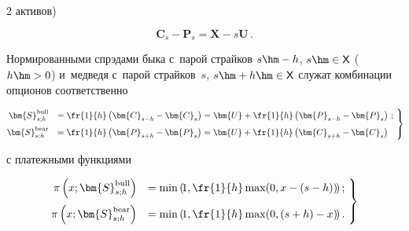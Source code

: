 \begin{multicols}{2}
активов)


  $$


  \bm{C}_s-\bm{P}_s= \bm{X}-s\bm{U}\,.


  $$


  


  Нормированными спрэдами быка с~парой страйков $s\hm-h$, $s \hm\in 


{\mathsf X}$ ($h \hm>0$)  и~медведя с~парой страйков~$s$, $s\hm+h \hm\in 


{\mathsf X}$ служат комбинации опционов соответственно 


  \begin{equation}


  \left.


  \begin{array}{rl}


 \!\!\!\! \bm{S}_{s;h}^{\mathrm{bull}} &= \fr{1}{h}\left( \bm{C}_{s-h}-\bm{C}_s\right) =


\bm{U}+\fr{1}{h}\left( \bm{P}_{s-h}-\bm{P}_s\right)\,;\\[6pt]


 \!\! \!\! \bm{S}_{s;h}^{\mathrm{bear}} &=\fr{1}{h}\left( \bm{P}_{s+h}-\bm{P}_s\right) 


=\bm{U}+\fr{1}{h} \left( \bm{C}_{s+h}-\bm{C}_s\right)


  \end{array}\!


  \right\}\!\!


  \label{e3-aga}


  \end{equation}


с платежными функциями 


\begin{equation}


\left.


\begin{array}{rl}


 \!\!\!\!\pi\left( x;\bm{S}_{s;h}^{\mathrm{bull}}\right) &= \min \left(\! 1,\fr{1}{h}\max (0,x-(s-h))\!\right);\\[9pt]


\! \!\!\!\pi\left( x;\bm{S}_{s;h}^{\mathrm{bear}}\right) &= \min \left(\! 1,\fr{1}{h}\max (0, (s+h)-x)\!\right).


\end{array}\!


\right\}\!


\label{e4-aga}


\end{equation}



\end{multicols}
